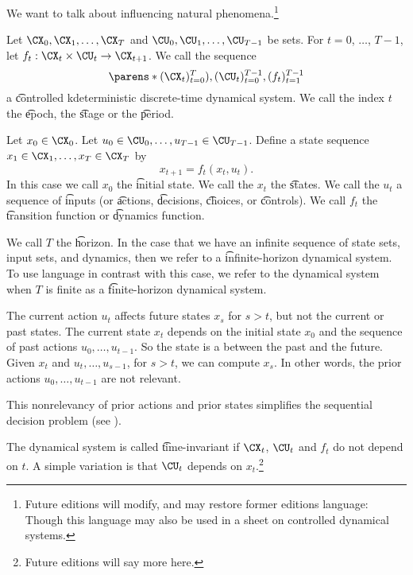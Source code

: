 

We want to talk about influencing natural phenomena.\footnote{Future editions will modify, and may restore former editions language:  Though this language may also be used in a sheet on  controlled dynamical systems.}


Let $\CX_0, \CX_1, \dots, \CX_{T}$ and $\CU_0, \CU_1, \dots, \CU_{T-1}$ be sets.
For $t = 0$, $\dots$, $T-1$, let $f_{t}: \CX_t \times \CU_t \to \CX_{t+1}$.
We call the sequence
\[
	\parens*{(\CX_t)_{t = 0}^{T}), (\CU_t)_{t=0}^{T-1}, (f_t)_{t=1}^{T-1}}
\]
a \t{controlled kdeterministic discrete-time dynamical system}.
We call the index $t$ the \t{epoch}, the \t{stage} or the \t{period}.

Let $x_0 \in \CX_0$.
Let $u_0 \in \CU_0, \dots, u_{T-1} \in \CU_{T-1}$. Define a state sequence $x_1 \in \CX_1, \dots, x_T \in \CX_T$ by
\[
    x_{t+1} = f_t(x_t, u_t).
\]
In this case we call $x_0$ the \t{initial state}.
We call the $x_t$ the \t{states}.
We call the $u_t$ a sequence of \t{inputs} (or \t{actions}, \t{decisions}, \t{choices}, or \t{controls}).
We call $f_t$ the \t{transition function} or \t{dynamics function}.

We call $T$ the \t{horizon}.
In the case that we have an infinite sequence of state sets, input sets, and dynamics, then we refer to a \t{infinite-horizon} dynamical system.
To use language in contrast with this case, we refer to the dynamical system when $T$ is finite as a \t{finite-horizon} dynamical system.


The current action $u_t$ affects future states $x_{s}$ for $s > t$, but not the current or past states.
The current state $x_t$ depends on the initial state $x_0$ and the sequence of past actions $u_0, \dots, u_{t-1}$.
So the state is a  between the past and the future.
Given $x_t$ and $u_t, \dots, u_{s-1}$, for $s > t$, we can compute $x_s$.
In other words, the prior actions $u_0, \dots, u_{t-1}$ are not relevant.

This nonrelevancy of prior actions and prior states simplifies the sequential decision problem (see ).


The dynamical system is called \t{time-invariant} if $\CX_{t}$, $\CU_t$ and $f_t$ do not depend on $t$.
A simple variation is that $\CU_t$ depends on $x_t$.\footnote{Future editions will say more here.}

